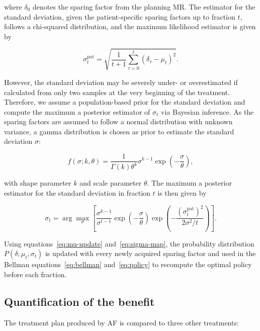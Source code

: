 \documentclass[11pt]{article}
\begin{document}
where $\delta_0$ denotes the sparing factor from the planning MR. The estimator for the standard deviation, given the patient-specific sparing factors up to fraction $t$, follows a chi-squared distribution, and the maximum likelihood estimator is given by

\begin{equation}
\sigma_t^{\mathrm{pat}} = \sqrt{\frac{1}{t+1}\sum_{\tau=0}^{t}\left(\delta_{\tau} - \mu_t\right)^2}.
\label{eq:sigma-pat}
\end{equation}

However, the standard deviation may be severely under- or overestimated if calculated from only two samples at the very beginning of the treatment. Therefore, we assume a population-based prior for the standard deviation and compute the maximum a posterior estimator of $\sigma_t$ via Bayesian inference. As the sparing factors are assumed to follow a normal distribution with unknown variance, a gamma distribution is chosen as prior to estimate the standard deviation $\sigma$:

\begin{equation}
f(\sigma; k, \theta) = \frac{1}{\Gamma(k)\theta^k}\sigma^{k-1}\exp\left(-\frac{\sigma}{\theta}\right),
\label{eq:gamma-prior}
\end{equation}

with shape parameter $k$ and scale parameter $\theta$. The maximum a posterior estimator for the standard deviation in fraction $t$ is then given by

\begin{equation}
\sigma_t = \arg\max_{\sigma}\left[\frac{\sigma^{k-1}}{\sigma^{t-1}} \exp\left(-\frac{\sigma}{\theta}\right)\exp\left(-\frac{(\sigma_t^{\mathrm{pat}})^2}{2\sigma^2/t}\right)\right].
\label{eq:sigma-map}
\end{equation}

Using equations~\eqref{eq:mu-update} and~\eqref{eq:sigma-map}, the probability distribution $P(\delta; \mu_t, \sigma_t)$ is updated with every newly acquired sparing factor and used in the Bellman equations~\eqref{eq:bellman} and~\eqref{eq:policy} to recompute the optimal policy before each fraction.

\subsection{Quantification of the benefit}

The treatment plan produced by AF is compared to three other treatments:
\end{document}
